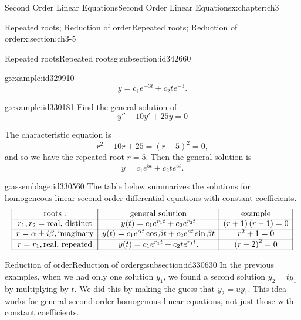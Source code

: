 \documentclass[oneside,10pt,]{book}
\numberwithin{equation}{section}
\numberwithin{equation}{section}
\newcommand{\amp}{&}
\begin{document}
\begin{chapterptx}{Second Order Linear Equations}{}{Second Order Linear Equations}{}{}{x:chapter:ch3}
\begin{sectionptx}{Repeated roots; Reduction of order}{}{Repeated roots; Reduction of order}{}{}{x:section:ch3-5}
\begin{subsectionptx}{Repeated roots}{}{Repeated roots}{}{}{g:subsection:id342660}
\begin{example}{}{g:example:id329910}
\begin{equation*}
y = c_1 e^{-3t} + c_2 t e^{-3}.
\end{equation*}
%
\end{example}
\begin{example}{}{g:example:id330181}%
Find the general solution of%
\begin{equation*}
y'' - 10 y' + 25 y = 0
\end{equation*}
%
\par
The characteristic equation is%
\begin{equation*}
r^2 - 10 r + 25 = (r - 5)^2 = 0,
\end{equation*}
and so we have the repeated root \(r = 5\). Then the general solution is%
\begin{equation*}
y = c_1 e^{5t} + c_2 te^{5t}.
\end{equation*}
%
\end{example}
\begin{assemblage}{}{g:assemblage:id330560}%
The table below summarizes the solutions for homogeneous linear second order differential equations with constant coefficients.%
\begin{equation*}
\begin{array}{|c|c|c|}
\hline
\text{roots}: \amp \text{general solution} \amp \text{example}\\
\hline
r_{1},r_{2}= \text{real, distinct} \amp y(t)=c_{1}e^{r_{1}t}+c_{2}e^{r_{2}t} \amp \left(r+1\right)\left(r-1\right)=0 \\
\hline
r=\alpha\pm i\beta,\text{imaginary} \amp y(t)=c_{1}e^{\alpha t}\cos \beta t+c_{2}e^{a t}\sin \beta t \amp r^{2}+1=0\\
\hline
r=r_{1},\text{real, repeated} \amp y(t)=c_{1}e^{r_{1}t}+c_{2}te^{r_{1}t}. \amp \left(r-2\right)^{2}=0\\
\hline
\end{array}
\end{equation*}
%
\end{assemblage}
\end{subsectionptx}
%
%
\typeout{************************************************}
\typeout{************************************************}
%
\begin{subsectionptx}{Reduction of order}{}{Reduction of order}{}{}{g:subsection:id330630}
In the previous examples, when we had only one solution \(y_{1}\), we found a second solution \(y_{2}=ty_{1}\) by multiplying by \(t\). We did this by making the guess that \(y_2 = u y_1\). This idea works for general second order homogenous linear equations, not just those with constant coefficients.%

\end{subsectionptx}
\end{sectionptx}
\end{chapterptx}
\end{document}
